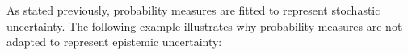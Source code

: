 As stated previously, probability measures are fitted to represent stochastic uncertainty. The following example illustrates why probability measures are not adapted to represent epistemic uncertainty:
